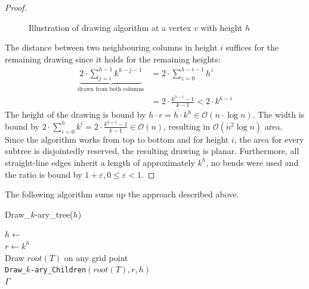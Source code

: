 \begin{proof}
\begin{figure}[H]
\begin{subfigure}{\textwidth}
		\end{subfigure}
	\caption{Illustration of drawing algorithm at a vertex $v$ with height $h$}\label{im:k-ary_trees_algorithm_illustration}
\end{figure}
	The distance between two neighbouring columns in height $i$ suffices for the remaining drawing since it holds for the remaining heights:
	\begin{align}
		\underbrace{2\cdot \sum_{j=i}^{h-1} k^{h-j-1}}_{\text{drawn from both columns}} &= 2\cdot\sum_{z = 0}^{h-i-1}h^z\\
		&= 2\cdot\frac{k^{h-i}-1}{k-1} < 2\cdot k^{h-i}
	\end{align}
	The height of the drawing is bound by $h\cdot r = h\cdot k^h \in \mathcal{O}(n\cdot \log n)$. 
	The width is bound by $2\cdot\sum_{i = 0}^{h} k^i = 2\cdot \frac{k^{h+1}-1}{k-1} \in \mathcal{O}(n)$, resulting in $\mathcal{O}(n^2\log n)$ area.\\ 
	Since the algorithm works from top to bottom and for height $i$, the area for every subtree is disjointedly reserved, the resulting drawing is planar. Furthermore, all straight-line edges inherit a length of approximately $k^h$, no bends were used and the ratio is bound by $1+\varepsilon, 0\leq \varepsilon<1$.
\end{proof}
\bigskip
The following algorithm sums up the approach described above.\\
\begin{algorithm}[H]
	\caption{Draw\_$k$-ary\_tree($h$)}\label{al:complete_k-ary_tree}
	$h \gets $ \\
	$r \gets k^h$\\
	Draw $root(T)$ on any grid point\\
	\texttt{Draw\_$k$-ary\_Children}$(root(T),r,h)$\\
	\Return $\Gamma$
\end{algorithm}
